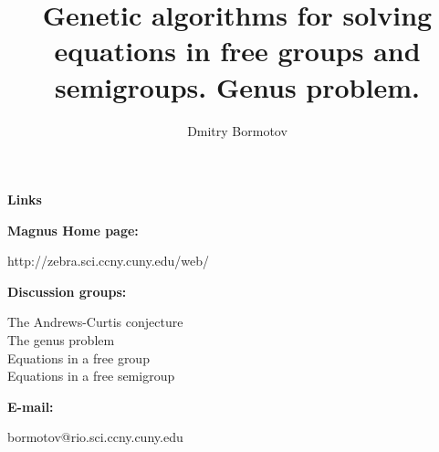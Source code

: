 \documentclass[12pt]{slides}
\title{Genetic algorithms for solving
equations in free groups and semigroups.  Genus problem.}
\author{Dmitry Bormotov} \date{}
\begin{document}
\pagestyle{empty}

\vspace{5mm}
\begin{center} \Large\textbf{Links} \end{center}
\vspace{12mm}

{\bf Magnus Home page:}

http://zebra.sci.ccny.cuny.edu/web/

{\bf Discussion groups:}

The Andrews-Curtis conjecture \\
The genus problem \\
Equations in a free group \\
Equations in a free semigroup

{\bf E-mail:}

bormotov@rio.sci.ccny.cuny.edu
\end{document}
